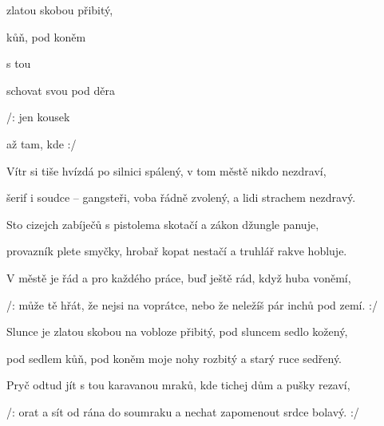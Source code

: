 

\zs
{} zlatou skobou  přibitý,

  

 kůň, pod koněm 

 
\ks

\zr
{}  s tou  

schovat svou  pod  děra

/: jen kousek   

až tam, kde   :/ 
\kr

\zs
Vítr si tiše hvízdá po silnici spálený, v tom městě nikdo nezdraví,

šerif i soudce -- gangsteři, voba řádně zvolený, a lidi strachem nezdravý.
\ks

\zs
Sto cizejch zabíječů s pistolema skotačí a zákon džungle panuje,

provazník plete smyčky, hrobař kopat nestačí a truhlář rakve hobluje.
\ks

\zr
V městě je řád a pro každého práce, buď ještě rád, když huba voněmí,

/: může tě hřát, že nejsi na voprátce, nebo že neležíš pár inchů pod zemí. :/
\kr

\zs
Slunce je zlatou skobou na vobloze přibitý, pod sluncem sedlo kožený,

pod sedlem kůň, pod koněm moje nohy rozbitý a starý ruce sedřený.
\ks

\zr
Pryč odtud jít s tou karavanou mraků, kde tichej dům a pušky rezaví,

/: orat a sít od rána do soumraku a nechat zapomenout srdce bolavý. :/
\kr

\kp
